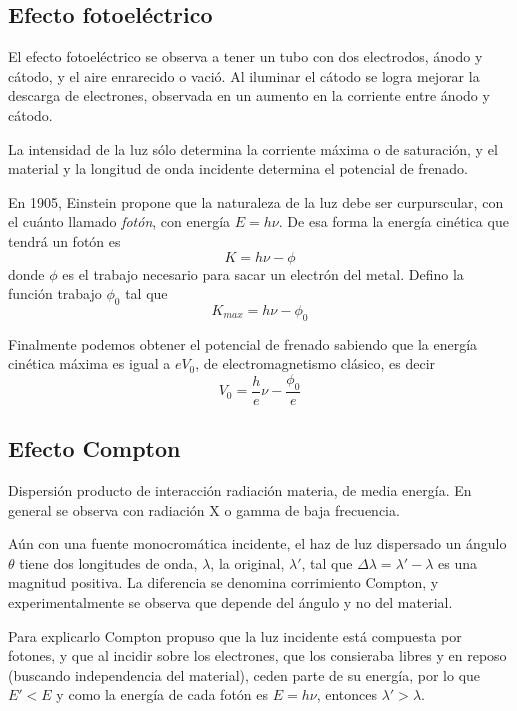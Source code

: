 \documentclass{book}
\numberwithin{equation}{section} %
\begin{document}
\subsection{Efecto fotoeléctrico}

El efecto fotoeléctrico se observa a tener un tubo con dos electrodos, ánodo y cátodo, y el aire enrarecido o vació. Al iluminar el cátodo se logra mejorar la descarga de electrones, observada en un aumento en la corriente entre ánodo y cátodo.

La intensidad de la luz sólo determina la corriente máxima o de saturación, y el material y la longitud de onda incidente determina el potencial de frenado.

En 1905, Einstein propone que la naturaleza de la luz debe ser curpurscular, con el cuánto llamado \emph{fotón}, con energía $E = h \nu$.
De esa forma la energía cinética que tendrá un fotón es
\begin{equation}
    K = h \nu - \phi
\end{equation}
donde $\phi$ es el trabajo necesario para sacar un electrón del metal.
Defino la función trabajo $\phi_0$ tal que
\begin{equation}
  K_{max} = h\nu - \phi_0
\end{equation}

Finalmente podemos obtener el potencial de frenado sabiendo que la energía cinética máxima es igual a $eV_0$, de electromagnetismo clásico, es decir
\begin{equation}
 V_0 = \frac{h}{e} \nu - \frac{\phi_0}{e}
 \label{eq:fotoelectrico}
\end{equation}


\subsection{Efecto Compton}
Dispersión producto de interacción radiación materia, de media energía. 
En general se observa con radiación X o gamma de baja frecuencia.

Aún con una fuente monocromática incidente, el haz de luz dispersado un ángulo $\theta$ tiene dos longitudes de onda, $\lambda$, la original, $\lambda'$, tal que  $\Delta \lambda = \lambda' - \lambda$ es una magnitud positiva.
La diferencia se denomina corrimiento Compton, y experimentalmente se observa que depende del ángulo y no del material.

Para explicarlo Compton propuso que la luz incidente está compuesta por fotones, y que al incidir sobre los electrones, que los consieraba libres y en reposo (buscando independencia del material), ceden parte de su energía, por lo que $E' < E$ y como la energía de cada fotón es $E = h \nu$, entonces $\lambda' > \lambda$.
\end{document}
